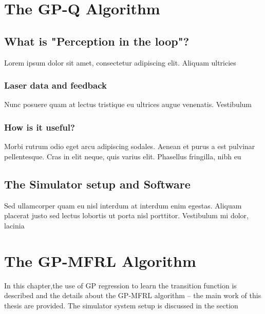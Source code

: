 \documentclass[12pt]{report}
\begin{document}
\chapter{The GP-Q Algorithm} %

\label{gpq} %
\section{What is "Perception in the loop"?}

Lorem ipsum dolor sit amet, consectetur adipiscing elit. Aliquam ultricies 

\subsection{Laser data and feedback}

Nunc posuere quam at lectus tristique eu ultrices augue venenatis. Vestibulum 


\subsection{How is it useful?}
Morbi rutrum odio eget arcu adipiscing sodales. Aenean et purus a est pulvinar pellentesque. Cras in elit neque, quis varius elit. Phasellus fringilla, nibh eu 


\section{The Simulator setup and Software}

Sed ullamcorper quam eu nisl interdum at interdum enim egestas. Aliquam placerat justo sed lectus lobortis ut porta nisl porttitor. Vestibulum mi dolor, lacinia 




\chapter{The GP-MFRL Algorithm} %
In this chapter,the use of GP regression to learn the transition function is described and the details about the GP-MFRL algorithm -- the main work of this thesis are provided. The simulator system setup is discussed in the section
\end{document}
